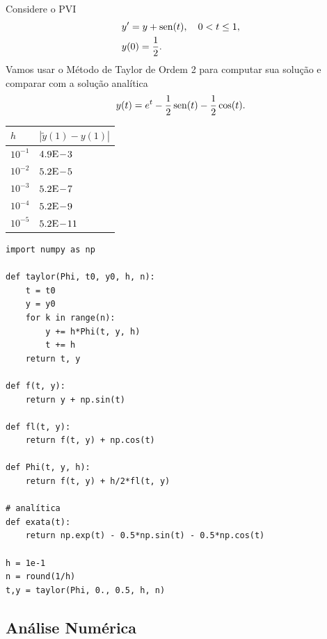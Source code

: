 \begin{ex}
  Considere o PVI
  \begin{subequations}
    \begin{align}
      &y' = y + \operatorname{sen}(t),\quad 0 < t \leq 1,\\
      &y(0) = \frac{1}{2}.
    \end{align}
  \end{subequations}
  Vamos usar o Método de Taylor de Ordem 2 para computar sua solução e comparar com a solução analítica
  \begin{equation}
    y(t) = e^t - \frac{1}{2}\operatorname{sen}(t) - \frac{1}{2}\cos(t).
  \end{equation}

  \begin{center}
    \begin{tabular}[H]{ll}
      $h$ & $\left|\tilde{y}(1) - y(1)\right|$\\\hline
      $10^{-1}$ & $4.9\mathrm{E}\!-\!3$ \\
      $10^{-2}$ & $5.2\mathrm{E}\!-\!5$ \\
      $10^{-3}$ & $5.2\mathrm{E}\!-\!7$ \\
      $10^{-4}$ & $5.2\mathrm{E}\!-\!9$ \\
      $10^{-5}$ & $5.2\mathrm{E}\!-\!11$ \\\hline
    \end{tabular}
  \end{center}

\begin{lstlisting}[caption=taylor.py, label=cap_pvi_sec_taylor:cod:taylor.py]
import numpy as np

def taylor(Phi, t0, y0, h, n):
    t = t0
    y = y0
    for k in range(n):
        y += h*Phi(t, y, h)
        t += h
    return t, y

def f(t, y):
    return y + np.sin(t)

def fl(t, y):
    return f(t, y) + np.cos(t)

def Phi(t, y, h):
    return f(t, y) + h/2*fl(t, y)

# analítica
def exata(t):
    return np.exp(t) - 0.5*np.sin(t) - 0.5*np.cos(t)

h = 1e-1
n = round(1/h)
t,y = taylor(Phi, 0., 0.5, h, n)
\end{lstlisting}
\end{ex}

\subsection{Análise Numérica}

